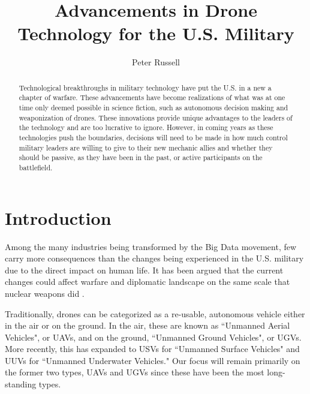 \documentclass[sigconf]{acmart}
\begin{document}
\title{Advancements in Drone Technology for the U.S. Military}

\author{Peter Russell}

\begin{abstract}
Technological breakthroughs in military technology have put the U.S. in a new a chapter of warfare. These advancements have become realizations of what was at one time only deemed possible in science fiction, such as autonomous decision making and weaponization of drones. These innovations provide unique advantages to the leaders of the technology and are too lucrative to ignore. However, in coming years as these technologies push the boundaries, decisions will need to be made in how much control military leaders are willing to give to their new mechanic allies and whether they should be passive, as they have been in the past, or active participants on the battlefield.
\end{abstract}


\maketitle

\section{Introduction}
Among the many industries being transformed by the Big Data movement, few carry more consequences than the changes being experienced in the U.S. military due to the direct impact on human life. It has been argued that the current changes could affect warfare and diplomatic landscape on the same scale that nuclear weapons did \cite{aireport}. 

Traditionally, drones can be categorized as a re-usable, autonomous vehicle either in the air or on the ground. In the air, these are known as ``Unmanned Aerial Vehicles", or UAVs, and on the ground, ``Unmanned Ground Vehicles", or UGVs. More recently, this has expanded to USVs for ``Unmanned Surface Vehicles" and UUVs for ``Unmanned Underwater Vehicles." Our focus will remain primarily on the former two types, UAVs and UGVs since these have been the most long-standing types.
\end{document}
